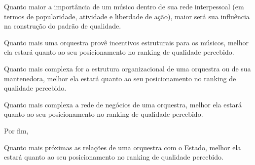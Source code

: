 \documentclass[a4paper, 12pt, openright, oneside, german, french, english, brazil]{abntex2}
\begin{document}
	\begin{hip}
		Quanto maior a importância de um músico dentro de sua rede interpessoal (em termos de popularidade, atividade e liberdade de ação), maior será sua influência na construção do padrão de qualidade.
	\end{hip}
	

	
	\begin{hip}
		Quanto mais uma orquestra provê incentivos estruturais para os músicos, melhor ela estará quanto ao seu posicionamento no ranking de qualidade percebido.
	\end{hip}
	
	
	\begin{hip}
		Quanto mais complexa for a estrutura organizacional de uma orquestra ou de sua mantenedora, melhor ela estará quanto ao seu posicionamento no ranking de qualidade percebido.
	\end{hip}
	
	\begin{hip}
		Quanto mais complexa a rede de negócios de uma orquestra, melhor ela estará quanto ao seu posicionamento no ranking de qualidade percebido.
	\end{hip}
	
	
	Por fim,
	
	\begin{hip}
		Quanto mais próximas as relações de uma orquestra com o Estado, melhor ela estará quanto ao seu posicionamento no ranking de qualidade percebido.
	\end{hip}
\end{document}
